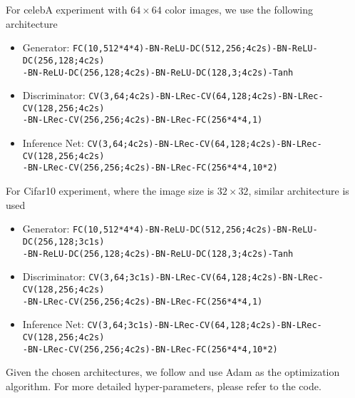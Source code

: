 \documentclass[a4paper]{article}
\begin{document}
For celebA experiment with $64 \times 64$ color images, we use the following architecture 
{\footnotesize
\begin{itemize}[leftmargin=16pt,labelindent=16pt]
\item Generator: \texttt{FC(10,512*4*4)-BN-ReLU-DC(512,256;4c2s)-BN-ReLU-DC(256,128;4c2s)}\\ 
\texttt{-BN-ReLU-DC(256,128;4c2s)-BN-ReLU-DC(128,3;4c2s)-Tanh}
\item Discriminator: \texttt{CV(3,64;4c2s)-BN-LRec-CV(64,128;4c2s)-BN-LRec-CV(128,256;4c2s)}\\ 
\texttt{-BN-LRec-CV(256,256;4c2s)-BN-LRec-FC(256*4*4,1)}
\item Inference Net: \texttt{CV(3,64;4c2s)-BN-LRec-CV(64,128;4c2s)-BN-LRec-CV(128,256;4c2s)}\\ 
\texttt{-BN-LRec-CV(256,256;4c2s)-BN-LRec-FC(256*4*4,10*2)}
\end{itemize}}
For Cifar10 experiment, where the image size is $32 \times 32$, similar architecture is used
{\footnotesize
\begin{itemize}[leftmargin=16pt,labelindent=16pt]
\item Generator: \texttt{FC(10,512*4*4)-BN-ReLU-DC(512,256;4c2s)-BN-ReLU-DC(256,128;3c1s)}\\ 
\texttt{-BN-ReLU-DC(256,128;4c2s)-BN-ReLU-DC(128,3;4c2s)-Tanh}
\item Discriminator: \texttt{CV(3,64;3c1s)-BN-LRec-CV(64,128;4c2s)-BN-LRec-CV(128,256;4c2s)}\\ 
\texttt{-BN-LRec-CV(256,256;4c2s)-BN-LRec-FC(256*4*4,1)}
\item Inference Net: \texttt{CV(3,64;3c1s)-BN-LRec-CV(64,128;4c2s)-BN-LRec-CV(128,256;4c2s)}\\ 
\texttt{-BN-LRec-CV(256,256;4c2s)-BN-LRec-FC(256*4*4,10*2)}
\end{itemize}}

Given the chosen architectures, we follow \citet{radford2015unsupervised} and use Adam as the optimization algorithm.
For more detailed hyper-parameters, please refer to the code.
\end{document}
